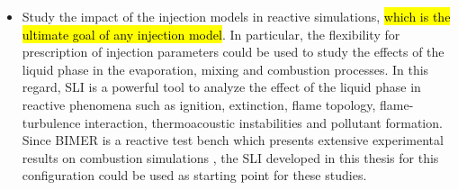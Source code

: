 \begin{itemize}
	\item Study the impact of the injection models in reactive simulations, \hl{which is the ultimate goal of any injection model}. In particular, the flexibility for prescription of injection parameters could be used to study the effects of the liquid phase in the evaporation, mixing and combustion processes. In this regard, SLI is a powerful tool to analyze the effect of the liquid phase in reactive phenomena such as ignition, extinction, flame topology, flame-turbulence interaction, thermoacoustic instabilities and pollutant formation. Since BIMER is a reactive test bench which presents extensive experimental results on combustion simulations , the SLI developed in this thesis  for this configuration could be used as starting point for these studies.
	



\end{itemize}

